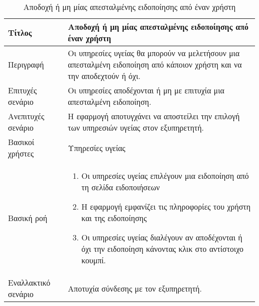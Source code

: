 \begin{table}[h]
 \caption{Αποδοχή ή μη μίας απεσταλμένης ειδοποίησης από έναν χρήστη}
\begin{center}
\begin{tabular}{ | m{10em} |  m{25em} | } 
\hline
 Τίτλος & Αποδοχή ή μη μίας απεσταλμένης ειδοποίησης από έναν χρήστη \\ 
\hline
 Περιγραφή & Οι υπηρεσίες υγείας θα μπορούν να μελετήσουν μια απεσταλμένη ειδοποίηση από κάποιον χρήστη και να την αποδεχτούν ή όχι.\\
\hline
 Επιτυχές σενάριο & Οι υπηρεσίες αποδέχονται ή μη με επιτυχία μια απεσταλμένη ειδοποίηση.\\
\hline
 Ανεπιτυχές σενάριο  & Η εφαρμογή αποτυγχάνει να αποστείλει την επιλογή των υπηρεσιών υγείας στον εξυπηρετητή. \\ 
\hline
 Βασικοί χρήστες  & Υπηρεσίες υγείας \\ 
\hline
 Βασική ροή  & 
\begin{enumerate}
\item Οι υπηρεσίες υγείας επιλέγουν μια ειδοποίηση από τη σελίδα ειδοποιήσεων
\item Η εφαρμογή εμφανίζει τις πληροφορίες του χρήστη και της ειδοποίησης
\item Οι υπηρεσίες υγείας διαλέγουν αν αποδέχονται ή όχι την ειδοποίηση κάνοντας κλικ στο αντίστοιχο κουμπί.
\end{enumerate}
 \\ 
\hline
 Εναλλακτικό σενάριο  & Αποτυχία σύνδεσης με τον εξυπηρετητή. \\ 
\hline
\end{tabular}
\end{center}
\end{table}

